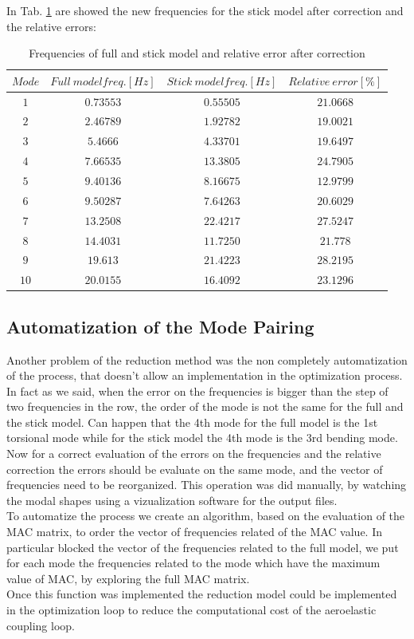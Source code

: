 \newpage
In Tab. \ref{tab:t2} are showed the new frequencies for the stick model after correction and the relative errors:
\begin{table}
	\begin{tabular}{cccc}
		\toprule
		$Mode $  &  $Full\  model freq. [Hz]$  &  $Stick\  model freq. [Hz]$ & $Relative \ error [\%]$ \\
		\midrule
		$1$  &  $0.73553$  &  $0.55505$ & $ 21.0668$\\
		$2$  &  $2.46789$  &  $1.92782$ & $ 19.0021 $\\
		$3$  &  $5.4666$  &  $4.33701$  &$  19.6497$\\
		$4$  &  $7.66535$  &  $13.3805$ &$ 24.7905 $  \\
		$5$  &  $9.40136$  &  $8.16675$  &$ 12.9799 $\\
		$6$  &  $9.50287$  &  $7.64263$  &$ 20.6029 $\\
		$7$  &  $13.2508$  &  $22.4217$  &$ 27.5247   $\\
		$8$  &  $14.4031$  &  $11.7250$  &$21.778 $\\
		$9$  &  $19.613$  &  $21.4223$  &$28.2195  $\\
		$10$  &  $20.0155$  & $16.4092$ &$ 23.1296$ \\
		\bottomrule
	\end{tabular}
	\caption{Frequencies of full and stick model and relative error after correction}
	\label{tab:t2}
\end{table} 
\subsection{Automatization of the Mode Pairing }
Another problem of the reduction method was the non completely automatization of the process, that doesn't allow an implementation in the optimization process. In fact as we said, when the error on the frequencies is bigger than the step of two frequencies in the row, the order of the mode is not the same for the full and the stick model. Can happen that the 4th mode for the full model is the 1st torsional mode while for the stick model the 4th mode is the 3rd bending mode. Now for a correct evaluation of the errors on the frequencies and the relative correction the errors should be evaluate on the same mode, and the vector of frequencies need to be reorganized. This operation was did manually, by watching the modal shapes using a vizualization software for the output files. \\
To automatize the process we create an algorithm, based on the evaluation of the MAC matrix, to order the vector of frequencies related of the MAC value. In particular blocked the vector of the frequencies related to the full model, we put for each mode the frequencies related to the mode which have the maximum value of MAC, by exploring the full MAC matrix.\\
Once this function was implemented the reduction model could be implemented in the optimization loop to reduce the computational cost of the aeroelastic coupling loop.

